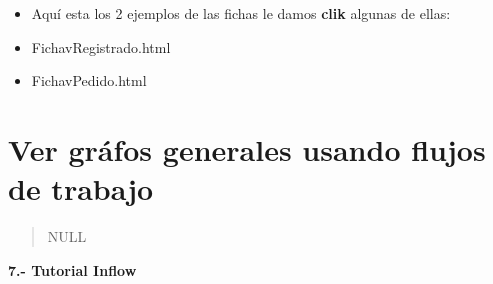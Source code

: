 \documentclass[letterpaper,11pt,spanish]{sphinxmanual}
\begin{document}
\begin{itemize}
\item {} 
Aquí esta los 2 ejemplos de las fichas le damos \textbf{clik} algunas de ellas:

\end{itemize}
\begin{itemize}
\item {} 
FichavRegistrado.html

\item {} 
FichavPedido.html

\end{itemize}


\chapter{Ver gráfos generales usando flujos de trabajo}
\label{_templates/Contenido6/Parte6:fichavregistrado-html}\label{_templates/Contenido6/Parte6:ver-grafos-generales-usando-flujos-de-trabajo}\label{_templates/Contenido6/Parte6::doc}\begin{quote}

NULL
\end{quote}

\textbf{7.- Tutorial Inflow}
\end{document}
